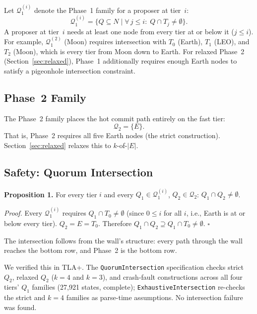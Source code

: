 \documentclass[11pt]{article}
\begin{document}
Let $\mathcal{Q}_1^{(i)}$ denote the Phase~1 family for a proposer at tier~$i$:
\[
\mathcal{Q}_1^{(i)} = \bigl\{Q \subseteq N \;\big|\; \forall\, j \le i:\; Q \cap T_j \neq \emptyset\bigr\}.
\]
A proposer at tier~$i$ needs at least one node from every tier at or below it ($j \le i$). For example, $\mathcal{Q}_1^{(2)}$ (Moon) requires intersection with $T_0$ (Earth), $T_1$ (LEO), and $T_2$ (Moon), which is every tier from Moon down to Earth. For relaxed Phase~2 (Section~\ref{sec:relaxed}), Phase~1 additionally requires enough Earth nodes to satisfy a pigeonhole intersection constraint.

\subsection{Phase~2 Family}

The Phase~2 family places the hot commit path entirely on the fast tier:
\[
\mathcal{Q}_2 = \{E\}.
\]
That is, Phase~2 requires all five Earth nodes (the strict construction). Section~\ref{sec:relaxed} relaxes this to $k$-of-$|E|$.

\subsection{Safety: Quorum Intersection}

\textbf{Proposition 1.} For every tier $i$ and every $Q_1 \in \mathcal{Q}_1^{(i)}$, $Q_2 \in \mathcal{Q}_2$: $Q_1 \cap Q_2 \neq \emptyset$.

\textit{Proof.} Every $\mathcal{Q}_1^{(i)}$ requires $Q_1 \cap T_0 \neq \emptyset$ (since $0 \le i$ for all $i$, i.e., Earth is at or below every tier). $Q_2 = E = T_0$. Therefore $Q_1 \cap Q_2 \supseteq Q_1 \cap T_0 \neq \emptyset$. \hfill $\square$

The intersection follows from the wall's structure: every path through the wall reaches the bottom row, and Phase~2 is the bottom row.

We verified this in TLA+. The \texttt{QuorumIntersection} specification checks strict $Q_2$, relaxed $Q_2$ ($k = 4$ and $k = 3$), and crash-fault constructions across all four tiers' $Q_1$ families (27{,}921 states, complete); \texttt{ExhaustiveIntersection} re-checks the strict and $k{=}4$ families as parse-time assumptions. No intersection failure was found.
\end{document}
